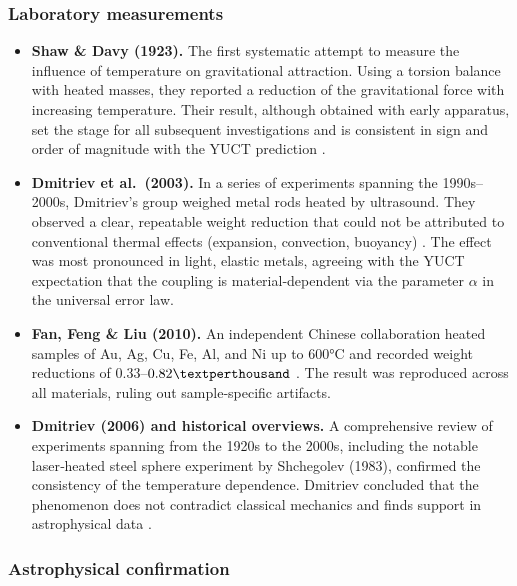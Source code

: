 \documentclass[12pt]{article}
\theoremstyle{remark}
\begin{document}
	\subsubsection*{Laboratory measurements}
	
	\begin{itemize}
		\item \textbf{Shaw \& Davy (1923).} The first systematic attempt to measure the influence of temperature on gravitational attraction. Using a torsion balance with heated masses, they reported a reduction of the gravitational force with increasing temperature. Their result, although obtained with early apparatus, set the stage for all subsequent investigations and is consistent in sign and order of magnitude with the YUCT prediction \cite{ShawDavy1923}.
		
		\item \textbf{Dmitriev et al.\ (2003).} In a series of experiments spanning the 1990s–2000s, Dmitriev's group weighed metal rods heated by ultrasound. They observed a clear, repeatable weight reduction that could not be attributed to conventional thermal effects (expansion, convection, buoyancy) \cite{Dmitriev2003}. The effect was most pronounced in light, elastic metals, agreeing with the YUCT expectation that the coupling is material‑dependent via the parameter \(\alpha\) in the universal error law.
		
		\item \textbf{Fan, Feng \& Liu (2010).} An independent Chinese collaboration heated samples of Au, Ag, Cu, Fe, Al, and Ni up to 600°C and recorded weight reductions of \(0.33\)–\(0.82\textperthousand\) \cite{Fan2010}. The result was reproduced across all materials, ruling out sample‑specific artifacts.
		
		\item \textbf{Dmitriev (2006) and historical overviews.} A comprehensive review of experiments spanning from the 1920s to the 2000s, including the notable laser‑heated steel sphere experiment by Shchegolev (1983), confirmed the consistency of the temperature dependence. Dmitriev concluded that the phenomenon does not contradict classical mechanics and finds support in astrophysical data \cite{Dmitriev2006}.
	\end{itemize}
	
	\subsubsection*{Astrophysical confirmation}
	
\end{document}
